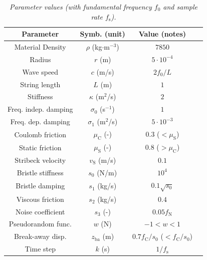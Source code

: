 \documentclass[twoside,a4paper,dvipsnames]{article}
\begin{document}
\begin{table}[ht]
  \caption{{\it Parameter values (with fundamental frequency $f_0$ and sample rate $f_\text{s}$).}}
	\centering
  \begin{tabular}{|c|c|c|c|}\hline
    Parameter & Symb. (unit) & Value (notes)\\ \hline
    Material Density &$\rho$ (kg$\cdot$m$^{-3}$) & $7850$ \\
    Radius & $r$ (m) & $5\cdot10^{-4}$\\
    Wave speed & $c$ (m/s) & $2 f_0/L$\\
    String length & $L$ (m) & $1$\\
    Stiffness & $\kappa$ (m$^2$/s) & $2$\\
    Freq. indep. damping & $\sigma_0$ (s$^{-1}$) & $1$\\
    Freq. dep. damping & $\sigma_1$ (m$^{2}$/s) & $5 \cdot 10^{-3}$\\
    Coulomb friction & $\mu_\text{C}$ (-) & $0.3$ ($<\mu_\text{S}$) \\
    Static friction & $\mu_\text{S}$ (-) & $0.8$ ($>\mu_\text{C}$) \\
    Stribeck velocity & $v_\text{S}$ (m/s) & $0.1$ \\
    Bristle stiffness & $s_0$ (N/m)& $10^4$ \\
    Bristle damping & $s_1$ (kg/s)& $0.1\sqrt{s_0}$ \\
    Viscous friction & $s_2$ (kg/s) & $0.4$ \\
    Noise coefficient & $s_3$ (-) & $0.05f_\text{N}$ \\
    Pseudorandom func. & $w$ (N) & $-1<w<1$ \\
    Break-away disp.& $z_\text{ba}$ (m) & $0.7 f_\text{C}/s_0$ ($<f_\text{C}/s_0$) \\
    Time step & $k$ (s) & $1/f_\text{s}$ \\
    \hline
 \end{tabular}
  \label{tab:parameters}
\end{table}
\end{document}
